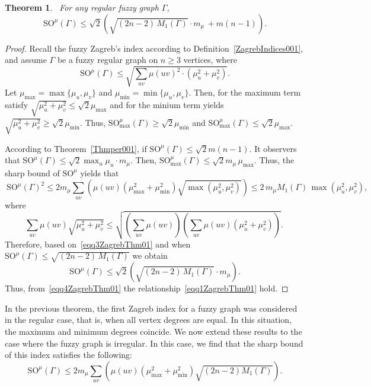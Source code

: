 \documentclass[12pt]{amsart}
\newtheorem{theorem}{Theorem}[section]
\newcommand{\SOG}{\mathrm{SO}^{\mu}}
\begin{document}
\begin{theorem}~\label{ZagrebThm01}
For any regular fuzzy graph $\Gamma$,
\begin{equation}~\label{eqq1ZagrebThm01}
\SOG(\Gamma) \leqslant \sqrt{2} \left(\sqrt{(2n-2)\,M_1(\Gamma)} \cdot m_{\mu}\,+m(n-1)\right).
\end{equation}
\end{theorem}
\begin{proof}
Recall the fuzzy Zagreb's index according to Definition~\ref{ZagrebIndices001}, and assume $\Gamma$ be a fuzzy regular graph on $n\geqslant 3$ vertices, where 
\begin{equation}~\label{eqq2ZagrebThm01}
\SOG(\Gamma)\leqslant \sqrt{ \sum_{uv} \mu(uv)^2 \cdot (\mu_u^2+\mu_v^2)}.
\end{equation}
Let $\mu_{\max}=\max\{\mu_u,\mu_v\}$ and $\mu_{\min}=\min\{\mu_u,\mu_v\}$. Then, for the maximum term satisfy $\sqrt{\mu_u^2 + \mu_v^2} \leqslant \sqrt{2} \mu_{\max}$ and for the minium term yields $\sqrt{\mu_u^2 + \mu_v^2} \geqslant \sqrt{2} \mu_{\min}.$ Thus, $\SOG_{\max}(\Gamma) \geqslant \sqrt{2} \mu_{\min}$ and $\SOG_{\max}(\Gamma) \leqslant \sqrt{2} \mu_{\max}$. 

According to Theorem~\ref{Thmper001}, if $\SOG(\Gamma)\leqslant \sqrt{2}m(n-1)$. It observers that $\SOG(\Gamma) \leqslant \sqrt{2} \max_u \mu_u \cdot m_{\mu}$. Then, $\SOG_{\max}(\Gamma) \leqslant \sqrt{2} m_\mu\, \mu_{\max}$. Thus, the sharp bound of $\SOG$ yields that 
\begin{equation}~\label{eqq3ZagrebThm01}
\SOG(\Gamma)^2 \leqslant 2 m_{\mu} \sum_{uv} \left(\mu(uv) \left(\mu_{\max}^2+\mu_{\min}^2\right)\sqrt{\max(\mu_u^2, \mu_v^2)}\right) \leqslant 2\,m_{\mu} M_1(\Gamma)\,\max(\mu_u^2, \mu_v^2),
\end{equation}
where 
\[
\sum_{uv} \mu(uv) \sqrt{\mu_u^2 + \mu_v^2} \leqslant \sqrt{ \left( \sum_{uv} \mu(uv) \right) \left( \sum_{uv} \mu(uv) (\mu_u^2 + \mu_v^2) \right) }.
\]
Therefore, based on~\eqref{eqq3ZagrebThm01} and when $\SOG(\Gamma)\leqslant\sqrt{(2n-2)\,M_1(\Gamma)}$ we obtain 
\begin{equation}~\label{eqq4ZagrebThm01}
\SOG(\Gamma) \leqslant \sqrt{2} \left(\sqrt{(2n-2)\,M_1(\Gamma)} \cdot m_{\mu}\right).
\end{equation}
 Thus, from~\eqref{eqq4ZagrebThm01} the relationship~\eqref{eqq1ZagrebThm01} hold.
\end{proof}
In the previous theorem, the first Zagreb index for a fuzzy graph was considered in the regular case, that is, when all vertex degrees are equal. In this situation, the maximum and minimum degrees coincide. We now extend these results to the case where the fuzzy graph is irregular. In this case, we find that the sharp bound of this index satisfies the following:
\begin{equation}~\label{eqq5ZagrebThm01}
\SOG(\Gamma) \leqslant 2 m_{\mu} \sum_{uv} \left(\mu(uv) \left(\mu_{\max}^2+\mu_{\min}^2\right)\sqrt{(2n-2)M_1(\Gamma)}\right).
\end{equation}
\end{document}
